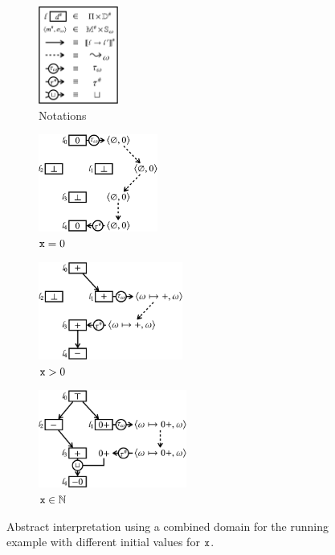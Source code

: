 \begin{figure}[t]
  \centering
  \begin{subfigure}[t]{0.15\textwidth}
    \includegraphics[height=3.2cm]{img/listing}
    \caption{Notations}
    \label{fig:ds-example1}
  \end{subfigure}
  \quad
  \begin{subfigure}[t]{0.23\textwidth}
    \includegraphics[height=3.2cm]{img/path-1}
    \caption{$\texttt{x} = 0$}
    \label{fig:ds-example2}
  \end{subfigure}
  \begin{subfigure}[t]{0.28\textwidth}
    \includegraphics[height=3.2cm]{img/path-2}
    \caption{$\texttt{x} > 0$}
    \label{fig:ds-example3}
  \end{subfigure}
  \begin{subfigure}[t]{0.28\textwidth}
    \includegraphics[height=3.2cm]{img/path-3}
    \caption{$\texttt{x} \in \mathbb{N}$}
    \label{fig:ds-example4}
  \end{subfigure}
  \caption{Abstract interpretation using a combined domain for the running
  example with different initial values for $\texttt{x}$.}
  \label{fig:ds-examples}
\end{figure}

